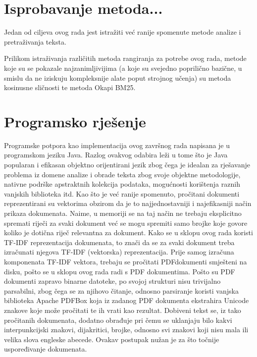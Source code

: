 \documentclass[times, utf8, zavrsni]{fer}
\begin{document}
\chapter{Isprobavanje metoda...}
Jedan od ciljeva ovog rada jest istražiti već ranije spomenute metode analize i pretraživanja teksta.

Prilikom istraživanja različitih metoda rangiranja za potrebe ovog rada, metode koje su se pokazale najzanimljivijima (a koje su svejedno poprilično bazične, u smislu da ne iziskuju kompleksnije alate poput strojnog učenja) su metoda kosinusne sličnosti te metoda Okapi BM25.

\chapter{Programsko rješenje}
Programske potpora kao implementacija ovog završnog rada napisana je u programskom jeziku Java. Razlog ovakvog odabira leži u tome što je Java popularan i efikasan objektno orijentirani jezik zbog čega je idealan za rješavanje problema iz domene analize i obrade teksta zbog svoje objektne metodologije, nativne podrške apstraktnih kolekcija podataka, mogućnosti korištenja raznih vanjskih biblioteka itd. \newline \newline
Kao što je već ranije spomenuto, pročitani dokumenti reprezentirani su vektorima obzirom da je to najjednostavniji i najefikasniji način prikaza dokumenata. Naime, u memoriji se na taj način ne trebaju eksplicitno spremati riječi za svaki dokument već se mogu spremiti samo brojke koje govore koliko je dotična riječ relevantna za dokument. Kako se u sklopu ovog rada koristi TF-IDF reprezentacija dokumenata, to znači da se za svaki dokument treba izračunati njegova TF-IDF (vektorska) reprezentacija. Prije samog izračuna komponenata TF-IDF vektora, trebaju se pročitati PDFdokumenti smješteni na disku, pošto se u sklopu ovog rada radi s PDF dokumentima. Pošto su PDF dokumenti zapravo binarne datoteke, po svojoj strukturi nisu trivijalno parsabilni, zbog čega se za njihovo čitanje, odnosno parsiranje koristi vanjska biblioteka Apache PDFBox koja iz zadanog PDF dokumenta ekstrahira Unicode znakove koje može pročitati te ih vrati kao rezultat. Dobiveni tekst se, iz tako pročitanih dokumenata, dodatno obrađuje pri čemu se uklanjaju bilo kakvi interpunkcijski znakovi, dijakritici, brojke, odnosno svi znakovi koji nisu mala ili velika slova engleske abecede. Ovakav postupak nužan je za što točnije uspoređivanje dokumenata.
\end{document}
